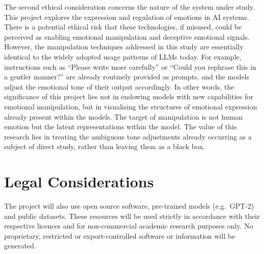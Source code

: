 \documentclass[12pt,twoside]{report}
\begin{document}
The second ethical consideration concerns the nature of the system under study. This project explores the expression and regulation of emotions in AI systems. There is a potential ethical risk that these technologies, if misused, could be perceived as enabling emotional manipulation and deceptive emotional signals. However, the manipulation techniques addressed in this study are essentially identical to the widely adopted usage patterns of LLMs today. For example, instructions such as ``Please write more carefully'' or ``Could you rephrase this in a gentler manner?'' are already routinely provided as prompts, and the models adjust the emotional tone of their output accordingly. In other words, the significance of this project lies not in endowing models with new capabilities for emotional manipulation, but in visualising the structures of emotional expression already present within the models. The target of manipulation is not human emotion but the latent representations within the model. The value of this research lies in treating the ambiguous tone adjustments already occurring as a subject of direct study, rather than leaving them as a black box.

\section{Legal Considerations}

The project will also use open source software, pre-trained models (e.g.\ GPT-2) and public datasets. These resources will be used strictly in accordance with their respective licences and for non-commercial academic research purposes only. No proprietary, restricted or export-controlled software or information will be generated.



\end{document}
